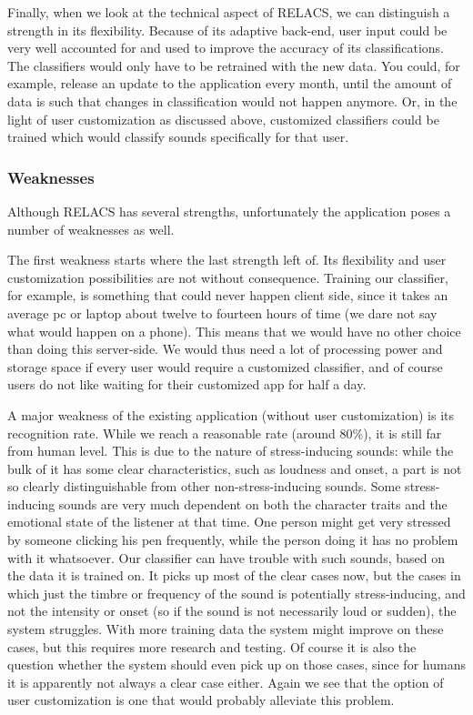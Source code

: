 \documentclass[a4paper]{article}
\begin{document}
Finally, when we look at the technical aspect of RELACS, we can distinguish a strength in its flexibility.
Because of its adaptive back-end, user input could be very well accounted for and used to improve the accuracy of its classifications.
The classifiers would only have to be retrained with the new data.
You could, for example, release an update to the application every month, until the amount of data is such that changes in classification would not happen anymore.
Or, in the light of user customization as discussed above, customized classifiers could be trained which would classify sounds specifically for that user.

\subsubsection{Weaknesses}
Although RELACS has several strengths, unfortunately the application poses a number of weaknesses as well.

The first weakness starts where the last strength left of.
Its flexibility and user customization possibilities are not without consequence.
Training our classifier, for example, is something that could never happen client side, since it takes an average pc or laptop about twelve to fourteen hours of time (we dare not say what would happen on a phone).
This means that we would have no other choice than doing this server-side.
We would thus need a lot of processing power and storage space if every user would require a customized classifier, and of course users do not like waiting for their customized app for half a day.

A major weakness of the existing application (without user customization) is its recognition rate.
While we reach a reasonable rate (around 80\%), it is still far from human level.
This is due to the nature of stress-inducing sounds:
while the bulk of it has some clear characteristics, such as loudness and onset, a part is not so clearly distinguishable from other non-stress-inducing sounds.
Some stress-inducing sounds are very much dependent on both the character traits and the emotional state of the listener at that time.
One person might get very stressed by someone clicking his pen frequently, while the person doing it has no problem with it whatsoever.
Our classifier can have trouble with such sounds, based on the data it is trained on.
It picks up most of the clear cases now,
but the cases in which just the timbre or frequency of the sound is potentially stress-inducing, and not the intensity or onset (so if the sound is not necessarily loud or sudden), the system struggles.
With more training data the system might improve on these cases, but this requires more research and testing.
Of course it is also the question whether the system should even pick up on those cases, since for humans it is apparently not always a clear case either.
Again we see that the option of user customization is one that would probably alleviate this problem.
\end{document}
